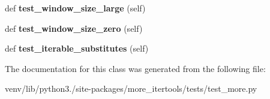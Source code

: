 \begin{DoxyCompactItemize}
def {\bfseries test\+\_\+window\+\_\+size\+\_\+large} (self)
\item 
\mbox{\label{classmore__itertools_1_1tests_1_1test__more_1_1_replace_tests_acf43582bd7788cf9a1271ec9d0636f64}} 
def {\bfseries test\+\_\+window\+\_\+size\+\_\+zero} (self)
\item 
\mbox{\label{classmore__itertools_1_1tests_1_1test__more_1_1_replace_tests_ae26ee4b35bcbf6d70daaf36346e40a39}} 
def {\bfseries test\+\_\+iterable\+\_\+substitutes} (self)
\end{DoxyCompactItemize}


The documentation for this class was generated from the following file\+:\begin{DoxyCompactItemize}
\item 
venv/lib/python3./site-\/packages/more\+\_\+itertools/tests/test\+\_\+more.\+py\end{DoxyCompactItemize}
